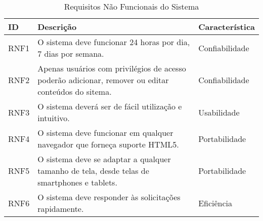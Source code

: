 \begin{table}[H]
\begin{tabular}{|l| p{11cm} ||l|}
	\hline
	\textbf{ID} & \textbf{Descrição} & \textbf{Característica}\tabularnewline
	\hline
	\hline
	RNF1 & O sistema deve funcionar 24 horas por dia, 7 dias por semana. & Confiabilidade\tabularnewline
	\hline
	RNF2 & Apenas usuários com privilégios de acesso poderão adicionar, remover ou editar conteúdos do sitema. & Confiabilidade\tabularnewline
	\hline
	RNF3 & O sistema deverá ser de fácil utilização e intuitivo. & Usabilidade\tabularnewline
	\hline
	RNF4 & O sistema deve funcionar em qualquer navegador que forneça suporte HTML5. & Portabilidade\tabularnewline
	\hline
	RNF5 & O sistema deve se adaptar a qualquer tamanho de tela, desde telas de smartphones e tablets. & Portabilidade\tabularnewline
	\hline
	RNF6 & O sistema deve responder às solicitações rapidamente. & Eficiência\tabularnewline
	\hline
\end{tabular}
\caption{Requisitos Não Funcionais do Sistema}
\label{Requisitos_nao_Funcionais_do_Sistema}
\end{table}
